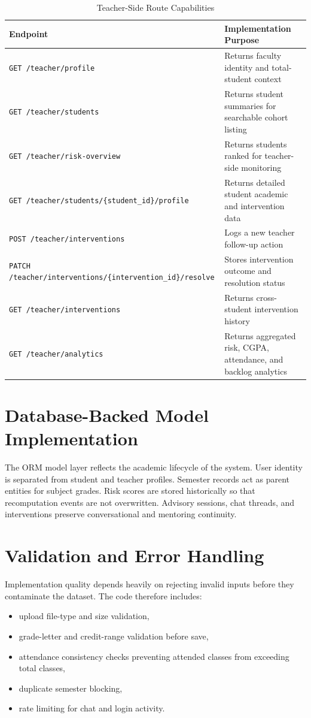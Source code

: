 \begin{table}[H]
\centering
\caption{Teacher-Side Route Capabilities}
\begin{tabularx}{\textwidth}{>{\raggedright\arraybackslash}p{} >{\raggedright\arraybackslash}X}
\toprule
\textbf{Endpoint} & \textbf{Implementation Purpose} \\
\midrule
\texttt{GET /teacher/profile} & Returns faculty identity and total-student context \\
\texttt{GET /teacher/students} & Returns student summaries for searchable cohort listing \\
\texttt{GET /teacher/risk-overview} & Returns students ranked for teacher-side monitoring \\
\texttt{GET /teacher/students/\{student\_id\}/profile} & Returns detailed student academic and intervention data \\
\texttt{POST /teacher/interventions} & Logs a new teacher follow-up action \\
\texttt{PATCH /teacher/interventions/\{intervention\_id\}/resolve} & Stores intervention outcome and resolution status \\
\texttt{GET /teacher/interventions} & Returns cross-student intervention history \\
\texttt{GET /teacher/analytics} & Returns aggregated risk, CGPA, attendance, and backlog analytics \\
\bottomrule
\end{tabularx}
\end{table}

\section{Database-Backed Model Implementation}
The ORM model layer reflects the academic lifecycle of the system. User identity is separated from student and teacher profiles. Semester records act as parent entities for subject grades. Risk scores are stored historically so that recomputation events are not overwritten. Advisory sessions, chat threads, and interventions preserve conversational and mentoring continuity.

\section{Validation and Error Handling}
Implementation quality depends heavily on rejecting invalid inputs before they contaminate the dataset. The code therefore includes:
\begin{itemize}[leftmargin=*]
\item upload file-type and size validation,
\item grade-letter and credit-range validation before save,
\item attendance consistency checks preventing attended classes from exceeding total classes,
\item duplicate semester blocking,
\item rate limiting for chat and login activity.
\end{itemize}

